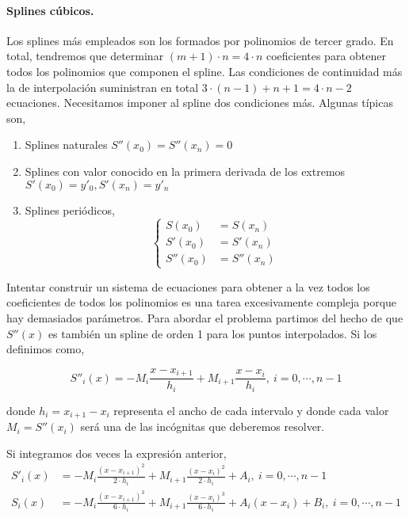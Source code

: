\paragraph{Splines cúbicos.}  Los splines más empleados son los formados por polinomios de tercer grado. En total, tendremos que determinar $(m+1)\cdot n=4\cdot n$ coeficientes para obtener todos los polinomios que componen el spline. Las condiciones de continuidad más la de interpolación suministran en total $3\cdot (n-1)+n+1=4\cdot n-2$  ecuaciones. Necesitamos imponer al spline dos condiciones más. Algunas típicas son,
\begin{enumerate}
\item Splines naturales $S''(x_0)=S''(x_n)=0$
\item Splines con valor conocido en la primera derivada de los extremos $S'(x_0)=y'_0, S'(x_n)=y'_n$
\item Splines periódicos,
\begin{equation*}
\left\{ 
\begin{aligned}
S(x_0)&=S(x_n)\\
S'(x_0)&=S'(x_n)\\
S''(x_0)&=S''(x_n)
\end{aligned}
\right.
\end{equation*}
\end{enumerate}

Intentar construir un sistema de ecuaciones para obtener a la vez todos los coeficientes de todos los polinomios es una tarea excesivamente compleja porque hay demasiados parámetros.  Para abordar el problema partimos del hecho de que $S''(x)$ es también un spline de orden 1 para los puntos interpolados. Si los definimos como,

\begin{equation*}
S''_i(x)=-M_i\frac{x-x_{i+1}}{h_i}+M_{i+1}\frac{x-x_i}{h_i},\   i=0,\cdots, n-1
\end{equation*}

donde $h_i=x_{i+1}-x_i$ representa el ancho de cada intervalo y donde cada valor $M_i=S''(x_i)$ será una de las incógnitas que deberemos resolver.

Si integramos dos veces la expresión anterior,
\begin{align*}
S'_i(x)&=-M_i\frac{(x-x_{i+1})^2}{2\cdot h_i}+M_{i+1}\frac{(x-x_i)^2}{2\cdot h_i}+A_i,\   i=0,\cdots, n-1\\
S_i(x)&=-M_i\frac{(x-x_{i+1})^3}{6\cdot h_i}+M_{i+1}\frac{(x-x_i)^3}{6\cdot h_i}+A_i(x-x_i)+B_i,\   i=0,\cdots, n-1\\
\end{align*}

